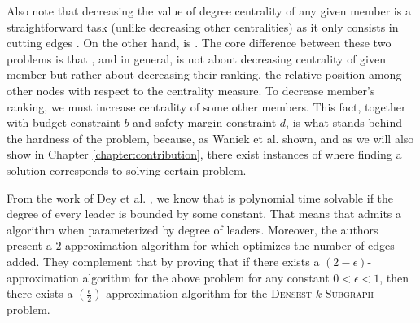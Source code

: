 Also note that decreasing the value of degree centrality of any given member is a straightforward task
(unlike decreasing other centralities) as it only consists in cutting edges \cite{Waniek2016}.
On the other hand, \HLdeg is \NPc \cite{Waniek2017}.
The core difference between these two problems is that \HLdeg, and \HLshort in general,
is not about decreasing centrality of given member but rather about decreasing their ranking,
the relative position among other nodes with respect to the centrality measure.
To decrease member's ranking, we must increase centrality of some other members.
This fact, together with budget constraint $b$ and safety margin constraint $d$,
is what stands behind the hardness of the \HL problem, because,
as Waniek et al. \cite{Waniek2017} shown, and as we will also show in Chapter \ref{chapter:contribution},
there exist instances of \HLshort where finding a solution corresponds to solving certain \NPh problem.

From the work of Dey et al. \cite{Dey2019}, we know that \HLdeg is polynomial time solvable
if the degree of every leader is bounded by some constant.
That means that \HLdeg admits a \FPT algorithm when parameterized by degree of leaders.
Moreover, the authors present a $2$-approximation algorithm for \HLdeg which optimizes
the number of edges added.
They complement that by proving that if there exists a $(2-\epsilon)$-approximation algorithm
for the above problem for any constant $0 < \epsilon < 1$, then there exists
a $(\frac{\epsilon}{2})$-approximation algorithm for the \textsc{Densest} $k$-\textsc{Subgraph} problem.
